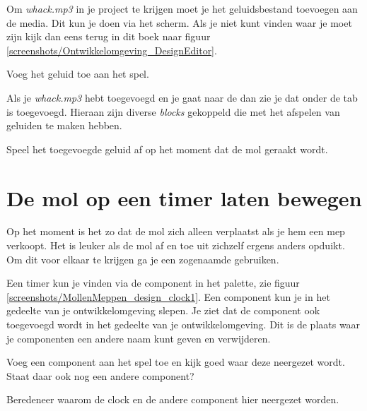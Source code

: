 Om \emph{whack.mp3} in je project te krijgen moet je het geluidsbestand toevoegen aan de media. Dit kun je doen via het  scherm. Als je niet kunt vinden waar je moet zijn kijk dan eens terug in dit boek naar figuur \ref{screenshots/Ontwikkelomgeving_DesignEditor}.

\begin{opgave}
    \opgVraag
	Voeg het geluid toe aan het spel. 
\end{opgave}

Als je \emph{whack.mp3} hebt toegevoegd en je gaat naar de  dan zie je dat onder de  tab  is toegevoegd. Hieraan zijn diverse \emph{blocks} gekoppeld die met het afspelen van geluiden te maken hebben. 
 
\begin{opgave}
    \opgVraag
	Speel het toegevoegde geluid af op het moment dat de mol geraakt wordt. 
\end{opgave}


\section{De mol op een timer laten bewegen}
Op het moment is het zo dat de mol zich alleen verplaatst als je hem een mep verkoopt. Het is leuker als de mol af en toe uit zichzelf ergens anders opduikt. Om dit voor elkaar te krijgen ga je een zogenaamde  gebruiken.
 
Een timer kun je vinden via de  component in het  palette, zie figuur \ref{screenshots/MollenMeppen_design_clock1}. 
Een component kun je in het  gedeelte van je ontwikkelomgeving slepen. Je ziet dat de component ook toegevoegd wordt in het  gedeelte van je ontwikkelomgeving. Dit is de plaats waar je componenten een andere naam kunt geven en verwijderen.
 
 
\begin{opgave}
    \opgVraag
	Voeg een  component aan het spel toe en kijk goed waar deze neergezet wordt. Staat daar ook nog een andere component?

  Beredeneer waarom de clock en de andere component hier neergezet worden. 
\end{opgave}

